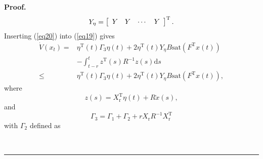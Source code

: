 \documentclass[9pt]{article}%
\newenvironment{proof}[1][Proof]{\noindent \textbf{#1.} }{\  \rule{0.5em}{0.5em}}
\begin{document}
\begin{proof}
\begin{equation}
Y_{\eta}=\left[
\begin{array}
[c]{cccc}%
Y & Y & \cdots & Y
\end{array}
\right]  ^{\mathrm{T}}. \label{eq21}%
\end{equation}
Inserting (\ref{eq20}) into (\ref{eq19}) gives%
\begin{align}
\dot{V}\left(  x_{t}\right)  =  &  \eta^{\mathrm{T}}\left(  t\right)
\Gamma_{3}\eta \left(  t\right)  +2\eta^{\mathrm{T}}\left(  t\right)  Y_{\eta
}B\mathrm{sat}\left(  F^{\mathrm{T}}x\left(  t\right)  \right) \nonumber \\
&  -\int_{t-r}^{t}z^{\mathrm{T}}\left(  s\right)  R^{-1}z\left(  s\right)
\mathrm{d}s\nonumber \\
\leq &  \eta^{\mathrm{T}}\left(  t\right)  \Gamma_{3}\eta \left(  t\right)
+2\eta^{\mathrm{T}}\left(  t\right)  Y_{\eta}B\mathrm{sat}\left(
F^{\mathrm{T}}x\left(  t\right)  \right)  , \label{eq22}%
\end{align}
where%
\[
z\left(  s\right)  =X_{\mathrm{r}}^{\mathrm{T}}\eta \left(  t\right)  +R\dot
{x}\left(  s\right)  ,
\]
and%
\begin{equation}
\Gamma_{3}=\Gamma_{1}+\Gamma_{2}+rX_{\mathrm{r}}R^{-1}X_{\mathrm{r}%
}^{\mathrm{T}} \label{eq23}%
\end{equation}
with $\Gamma_{2}$ defined as%


\end{proof}
\end{document}
